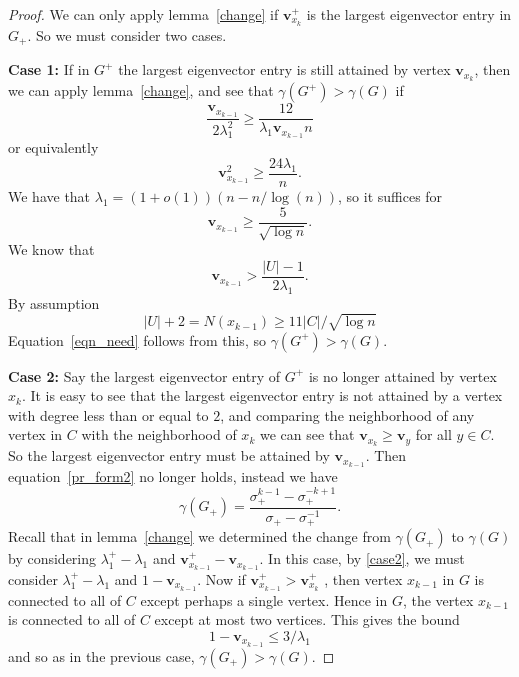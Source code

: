 \begin{proof}
  We can only apply lemma~\ref{change} if $\mathbf{v}_{x_{k}}^+$ is the
  largest eigenvector entry in $G_+$.  So we must consider two cases.


  \noindent \textbf{Case 1:} If in
  $G^+$ the largest eigenvector entry is still attained by vertex $\mathbf{v}_{x_k}$, then
  we can apply lemma~\ref{change}, and see that $\gamma(G^+) > \gamma(G)$
  if
   \[ \frac{\mathbf{v}_{x_{k-1}}}{2 \lambda_1^2} \geq \frac{12}{\lambda_1 \mathbf{v}_{x_{k-1}} n} \]
  or equivalently
   \[ \mathbf{v}_{x_{k-1}}^2 \geq \frac{24 \lambda_1}{n} .\]
  We have that $\lambda_1 = (1+o(1)) (n - n / \log(n))$, so it suffices for
  \begin{equation}\label{eqn_need}
   \mathbf{v}_{x_{k-1}} \geq \frac{5}{\sqrt{\log n}} .
  \end{equation}
  We know that
   \[ \mathbf{v}_{x_{k-1}} > \frac{|U| - 1}{2 \lambda_1} .\]
  By assumption
   \[ |U| + 2 = N(x_{k-1}) \geq 11 |C| / \sqrt{\log n} \]
  Equation~\ref{eqn_need} follows from this, so $\gamma(G^+) > \gamma(G)$.  

  \noindent \textbf{Case 2:} Say the largest eigenvector entry of $G^+$ is no
  longer attained by vertex $x_k$.  It is easy to see that the largest
  eigenvector entry is not attained by a vertex with degree less than or equal
  to $2$, and comparing the neighborhood of any vertex in $C$ with the neighborhood
  of $x_{k}$ we can see that $\mathbf{v}_{x_k} \geq \mathbf{v}_y$ for all $y \in C$.  So the
  largest eigenvector entry must be attained by $\mathbf{v}_{x_{k-1}}$.
  Then equation~\ref{pr_form2} no longer holds, instead we have
   \begin{equation}\label{case2} \gamma(G_+) = \frac{\sigma_+^{k-1} - \sigma_+^{-k+1}}{\sigma_+ - \sigma_+^{-1}} .\end{equation}
Recall that in lemma~\ref{change} we determined the change from $\gamma(G_+)$ to $\gamma(G)$ by considering $\lambda^+_1 - \lambda_1$ and $\mathbf{v}_{x_{k-1}}^+ - \mathbf{v}_{x_{k-1}}$. In this case, by \eqref{case2}, we must consider $\lambda^+_1 - \lambda_1$ and $1-\mathbf{v}_{x_{k-1}}$.
   Now if  $\mathbf{v}_{x_{k-1}}^+ > \mathbf{v}_{x_k}^+$ , then vertex $x_{k-1}$ in $G$
  is connected
  to all of $C$ except perhaps a single vertex.  Hence
  in $G$, the vertex $x_{k-1}$ is connected to all of $C$ except at most
  two vertices.  This gives the bound
   \[ 1 - \mathbf{v}_{x_{k-1}} \leq 3 / \lambda_1 \]
  and so as in the previous case, $\gamma(G_+) > \gamma(G)$.



\end{proof}
